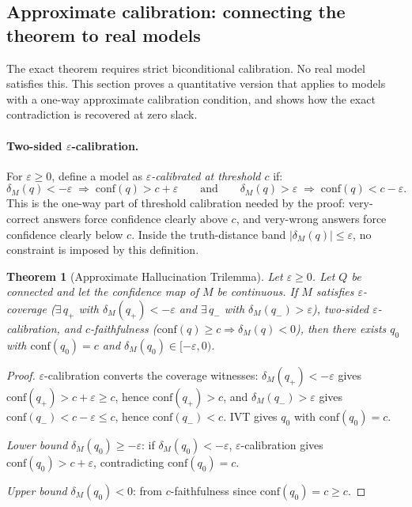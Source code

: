 \documentclass[10pt]{article}
\newtheorem{theorem}{Theorem}[section]
\newcommand{\conf}{\mathrm{conf}}
\begin{document}
\subsection{Approximate calibration: connecting the theorem to real models}
\label{sec:approx}

The exact theorem requires strict biconditional calibration. No real model
satisfies this. This section proves a quantitative version that applies to
models with a one-way approximate calibration condition, and shows how the
exact contradiction is recovered at zero slack.

\paragraph{Two-sided $\varepsilon$-calibration.}
For $\varepsilon \geq 0$, define a model as
\emph{$\varepsilon$-calibrated at threshold $c$} if:
\[
  \delta_M(q) < -\varepsilon \;\Rightarrow\; \conf(q) > c+\varepsilon
  \qquad\text{and}\qquad
  \delta_M(q) > \varepsilon \;\Rightarrow\; \conf(q) < c-\varepsilon.
\]
This is the one-way part of threshold calibration needed by the proof:
very-correct answers force confidence clearly above $c$, and very-wrong
answers force confidence clearly below $c$. Inside the truth-distance band
$|\delta_M(q)| \leq \varepsilon$, no constraint is imposed by this definition.

\begin{theorem}[Approximate Hallucination Trilemma]
\label{thm:approx}
Let $\varepsilon \geq 0$. Let $Q$ be connected and let the confidence map
of $M$ be continuous. If $M$ satisfies $\varepsilon$-coverage
($\exists\, q_+$ with $\delta_M(q_+) < -\varepsilon$ and $\exists\, q_-$ with
$\delta_M(q_-) > \varepsilon$), two-sided $\varepsilon$-calibration, and
$c$-faithfulness ($\conf(q) \geq c \Rightarrow \delta_M(q) < 0$), then there
exists $q_0$ with $\conf(q_0) = c$ and $\delta_M(q_0) \in [-\varepsilon, 0)$.
\end{theorem}

\begin{proof}
$\varepsilon$-calibration converts the coverage witnesses: $\delta_M(q_+) < -\varepsilon$
gives $\conf(q_+) > c+\varepsilon \geq c$, hence $\conf(q_+) > c$, and
$\delta_M(q_-) > \varepsilon$ gives $\conf(q_-) < c-\varepsilon \leq c$,
hence $\conf(q_-) < c$. IVT gives $q_0$ with $\conf(q_0) = c$.

\emph{Lower bound} $\delta_M(q_0) \geq -\varepsilon$: if $\delta_M(q_0) < -\varepsilon$,
$\varepsilon$-calibration gives $\conf(q_0) > c+\varepsilon$, contradicting
$\conf(q_0) = c$.

\emph{Upper bound} $\delta_M(q_0) < 0$: from $c$-faithfulness since $\conf(q_0) = c
\geq c$.
\end{proof}
\end{document}
